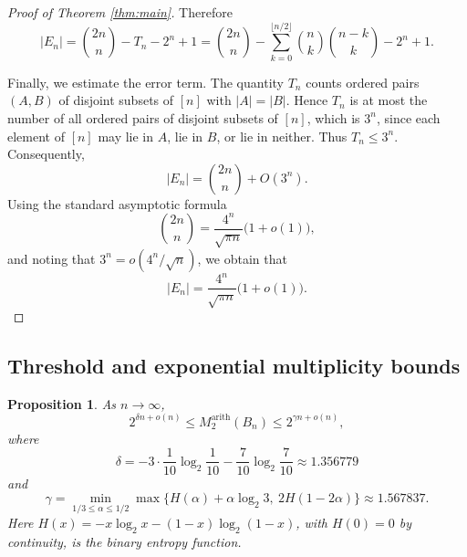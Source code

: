 \documentclass[twoside,12pt]{article}
\newtheorem{proposition}{Proposition}[section]
\begin{document}
\begin{proof}[Proof of Theorem \ref{thm:main}]
Therefore
\[
|E_n|
=
\binom{2n}{n}
-
T_n
-
2^n+1
=
\binom{2n}{n}
-
\sum_{k=0}^{\lfloor n/2\rfloor}
\binom{n}{k}\binom{n-k}{k}
-
2^n+1.
\]

Finally, we estimate the error term. The quantity $T_n$ counts ordered pairs $(A,B)$ of disjoint subsets of $[n]$ with $|A|=|B|$. Hence $T_n$ is at most the number of all ordered pairs of disjoint subsets of $[n]$, which is $3^n$, since each element of $[n]$ may lie in $A$, lie in $B$, or lie in neither. Thus
$T_n\leq 3^n$.
Consequently,
\[
|E_n|
=
\binom{2n}{n}+O(3^n).
\]
Using the standard asymptotic formula
\[
\binom{2n}{n}
=
\frac{4^n}{\sqrt{\pi n}}\bigl(1+o(1)\bigr),
\]
and noting that $3^n=o(4^n/\sqrt n)$, we obtain that 
\[
|E_n|
=
\frac{4^n}{\sqrt{\pi n}}\bigl(1+o(1)\bigr).
\]
\end{proof}

\subsection{Threshold and exponential multiplicity bounds}

\begin{proposition}\label{prop:global-bounds}
As $n\to\infty$,
\[
2^{\delta n+o(n)}
\leq M^{\mathrm{arith}}_2(B_n)
\leq 2^{\gamma n+o(n)},
\]
where
\[
\delta=-3\cdot\frac1{10}\log_2\frac1{10}-\frac7{10}\log_2\frac7{10}
      \approx 1.356779
\]
and
\[
\gamma=\min_{1/3\leq\alpha\leq1/2}
\max\{H(\alpha)+\alpha\log_2 3,\ 2H(1-2\alpha)\}
      \approx 1.567837.
\]
Here \(H(x)=-x\log_2x-(1-x)\log_2(1-x)\), with \(H(0)=0\) by continuity, is the binary entropy function.
\end{proposition}
\end{document}
